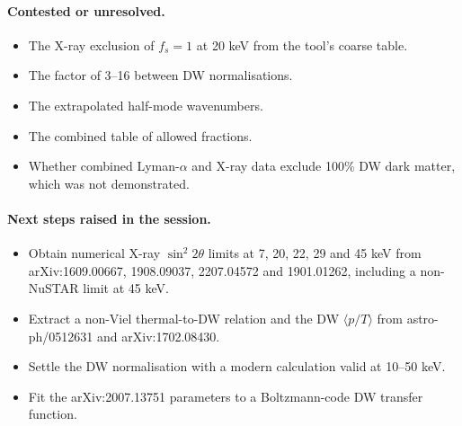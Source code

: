 \documentclass[11pt,a4paper]{article}
\begin{document}
\paragraph{Contested or unresolved.}
\begin{itemize}
\item The X-ray exclusion of $f_s=1$ at 20 keV from the tool's coarse table.
\item The factor of 3--16 between DW normalisations.
\item The extrapolated half-mode wavenumbers.
\item The combined table of allowed fractions.
\item Whether combined Lyman-$\alpha$ and X-ray data exclude 100\% DW dark matter, which was not demonstrated.
\end{itemize}

\paragraph{Next steps raised in the session.}
\begin{itemize}
\item Obtain numerical X-ray $\sin^2 2\theta$ limits at 7, 20, 22, 29 and 45 keV from arXiv:1609.00667, 1908.09037, 2207.04572 and 1901.01262, including a non-NuSTAR limit at 45 keV.
\item Extract a non-Viel thermal-to-DW relation and the DW $\langle p/T\rangle$ from astro-ph/0512631 and arXiv:1702.08430.
\item Settle the DW normalisation with a modern calculation valid at 10--50 keV.
\item Fit the arXiv:2007.13751 parameters to a Boltzmann-code DW transfer function.
\end{itemize}
\end{document}
